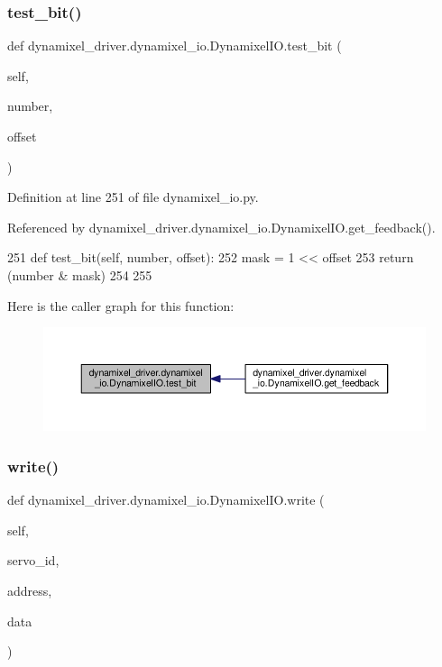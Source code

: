 \subsubsection{\texorpdfstring{test\+\_\+bit()}{test\_bit()}}
{\footnotesize\ttfamily def dynamixel\+\_\+driver.\+dynamixel\+\_\+io.\+Dynamixel\+I\+O.\+test\+\_\+bit (\begin{DoxyParamCaption}\item[{}]{self,  }\item[{}]{number,  }\item[{}]{offset }\end{DoxyParamCaption})}



Definition at line 251 of file dynamixel\+\_\+io.\+py.



Referenced by dynamixel\+\_\+driver.\+dynamixel\+\_\+io.\+Dynamixel\+I\+O.\+get\+\_\+feedback().


\begin{DoxyCode}
251     \textcolor{keyword}{def }test\_bit(self, number, offset):
252         mask = 1 << offset
253         \textcolor{keywordflow}{return} (number & mask)
254 
255 
\end{DoxyCode}
Here is the caller graph for this function\+:
\nopagebreak
\begin{figure}[H]
\begin{center}
\leavevmode
\includegraphics[width=350pt]{dd/d77/classdynamixel__driver_1_1dynamixel__io_1_1_dynamixel_i_o_ac617d4150cfc51f64cde863cc5902a8f_icgraph}
\end{center}
\end{figure}
\mbox{\label{classdynamixel__driver_1_1dynamixel__io_1_1_dynamixel_i_o_a32049f3a322d37054032b9d44be39192}} 
\subsubsection{\texorpdfstring{write()}{write()}}
{\footnotesize\ttfamily def dynamixel\+\_\+driver.\+dynamixel\+\_\+io.\+Dynamixel\+I\+O.\+write (\begin{DoxyParamCaption}\item[{}]{self,  }\item[{}]{servo\+\_\+id,  }\item[{}]{address,  }\item[{}]{data }\end{DoxyParamCaption})}

